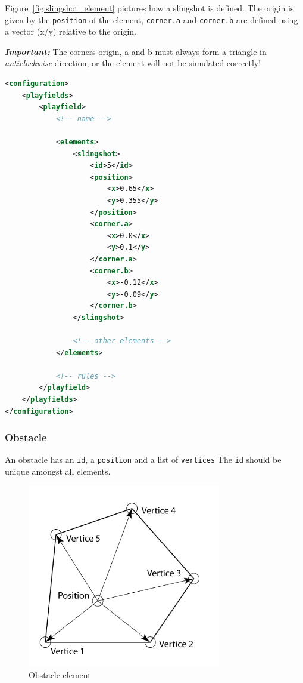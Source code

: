 \documentclass[fontsize=12pt,
               paper=a4,
               twoside=false,
               parskip=half,
               ]{scrartcl}
\begin{document}
Figure~\ref{fig:slingshot_element} pictures how a slingshot is defined. The origin is given by the \texttt{position} of the element, \texttt{corner.a} and \texttt{corner.b} are defined using a vector (x/y) relative to the origin.

\textbf{\textsl{Important:}} The corners origin, a and b must always form a triangle in \textsl{anticlockwise} direction, or the element will not be simulated correctly!

\begin{minipage}[]{\linewidth}
\begin{lstlisting}[language=xml,label=lst:slingshot,caption={slingshot}]
<configuration>
	<playfields>
		<playfield>
			<!-- name -->
			
			<elements>
				<slingshot>
					<id>5</id>
					<position>
						<x>0.65</x>
						<y>0.355</y>
					</position>
					<corner.a>
						<x>0.0</x>
						<y>0.1</y>
					</corner.a>
					<corner.b>
						<x>-0.12</x>
						<y>-0.09</y>
					</corner.b>
				</slingshot>
				
				<!-- other elements -->
			</elements>
			
			<!-- rules -->
		</playfield>
	</playfields>
</configuration>
\end{lstlisting}
\end{minipage}

\subsubsection{Obstacle}

An obstacle has an \texttt{id}, a \texttt{position} and a list of \texttt{vertices} The \texttt{id} should be unique amongst all elements. 

\begin{figure}[h!]
	\centering
	\includegraphics[height=8cm]{./img/manual/obstacle-element.png}
	\caption[Obstacle element]{Obstacle element}
	\label{fig:obstacle_element}
\end{figure}
\end{document}
